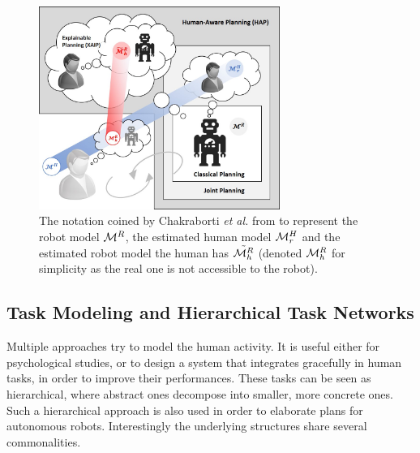 \documentclass[a4paper,11pt,twoside]{StyleThese}
\begin{document}
\begin{figure}
\centering
\includegraphics[width=0.7\textwidth]{figures/chapter1/chkraborti3models.png}
\caption{The notation coined by Chakraborti \textit{et al.} from \cite{chakraborti2018human} to represent the robot model $\mathcal{M}^R$, the estimated human model $\mathcal{M}^H_r$ and the estimated robot model the human has $\tilde{\mathcal{M}^R_h}$ (denoted $\mathcal{M}^R_h$ for simplicity as the real one is not accessible to the robot).}
\label{fig:chakraborti3models}
\end{figure}

\subsection{Task Modeling and Hierarchical Task Networks}
Multiple approaches try to model the human activity. It is useful either for psychological studies, or to design a system that integrates gracefully in human tasks, in order to improve their performances. These tasks can be seen as hierarchical, where abstract ones decompose into smaller, more concrete ones. Such a hierarchical approach is also used in order to elaborate plans for autonomous robots. Interestingly the underlying structures share several commonalities.
\end{document}
